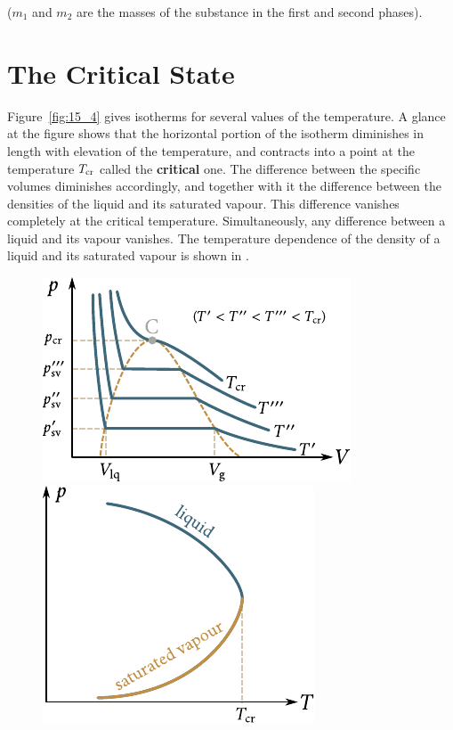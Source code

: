 \noindent
($m_1$ and $m_2$ are the masses of the substance in the first and second
phases).

\section{The Critical State}\label{sec:15_4}

Figure~\ref{fig:15_4} gives isotherms for several values of the temperature. A glance at the figure shows that the horizontal portion of the isotherm diminishes in length with elevation of the temperature, and contracts into a point at the temperature $T_{\text{cr}}$ called the \textbf{critical} one. The difference between the specific volumes diminishes accordingly, and together with it the difference between the densities of the liquid and its saturated vapour. This difference vanishes completely at the critical temperature. Simultaneously, any difference between a liquid and its vapour vanishes. The temperature dependence of the density of a liquid and its saturated vapour is shown in .

\begin{figure}[t]
	\begin{minipage}[t]{0.5\linewidth}
		\begin{center}
			\includegraphics[scale=1]{figures/ch_15/fig_15_4.pdf}
			\caption[]{}
			\label{fig:15_4}
		\end{center}
	\end{minipage}
	\hspace{-0.05cm}
	\begin{minipage}[t]{0.5\linewidth}
		\begin{center}
			\includegraphics[scale=1]{figures/ch_15/fig_15_5.pdf}
			\caption[]{}
			\label{fig:15_5}
		\end{center}
	\end{minipage}
	\vspace{-0.4cm}
\end{figure}

